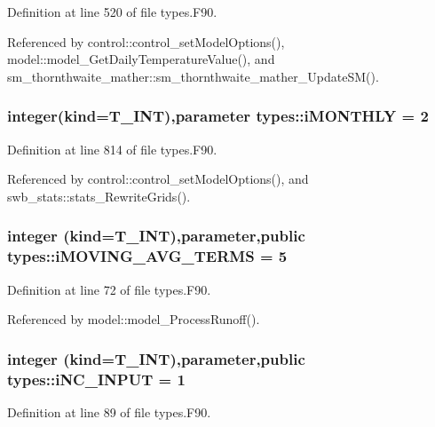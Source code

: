 Definition at line 520 of file types.F90.



Referenced by control::control\_\-setModelOptions(), model::model\_\-GetDailyTemperatureValue(), and sm\_\-thornthwaite\_\-mather::sm\_\-thornthwaite\_\-mather\_\-UpdateSM().

\hypertarget{namespacetypes_ababe8d6bc68f768e3d42595fb178ac05}{
\subsubsection[{iMONTHLY}]{\setlength{\rightskip}{0pt plus 5cm}integer(kind={\bf T\_\-INT}),parameter {\bf types::iMONTHLY} = 2}}
\label{namespacetypes_ababe8d6bc68f768e3d42595fb178ac05}


Definition at line 814 of file types.F90.



Referenced by control::control\_\-setModelOptions(), and swb\_\-stats::stats\_\-RewriteGrids().

\hypertarget{namespacetypes_abe11dbc06cabd68c258ab0fff0c89d26}{
\subsubsection[{iMOVING\_\-AVG\_\-TERMS}]{\setlength{\rightskip}{0pt plus 5cm}integer (kind={\bf T\_\-INT}),parameter,public {\bf types::iMOVING\_\-AVG\_\-TERMS} = 5}}
\label{namespacetypes_abe11dbc06cabd68c258ab0fff0c89d26}


Definition at line 72 of file types.F90.



Referenced by model::model\_\-ProcessRunoff().

\hypertarget{namespacetypes_ae36ea9f0739802b729005e07be23b389}{
\subsubsection[{iNC\_\-INPUT}]{\setlength{\rightskip}{0pt plus 5cm}integer (kind={\bf T\_\-INT}),parameter,public {\bf types::iNC\_\-INPUT} = 1}}
\label{namespacetypes_ae36ea9f0739802b729005e07be23b389}


Definition at line 89 of file types.F90.



